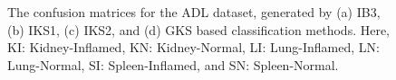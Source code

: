 \begin{figure}[h]
\centering
{} ~
\\
~
\caption[ The confusion matrices for the ADL dataset,  generated by IB3, IKS1, IKS2, and GKS based classification methods]{\fontsize{10}{12}\selectfont The confusion matrices for the ADL dataset,  generated by (a) IB3, (b) IKS1, (c) IKS2, and (d) GKS based classification methods. Here, KI: Kidney-Inflamed, KN: Kidney-Normal, LI: Lung-Inflamed, LN: Lung-Normal, SI: Spleen-Inflamed, and SN: Spleen-Normal.}
\label{ch3:fig:CMADL}
\end{figure}
